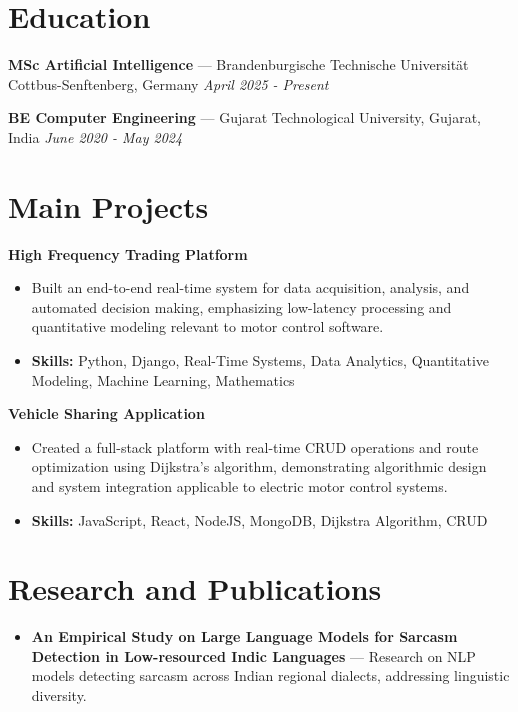 \documentclass[a4paper,10pt]{article}
\begin{document}
\section*{Education}
\textbf{MSc Artificial Intelligence} — Brandenburgische Technische Universität Cottbus-Senftenberg, Germany \hfill \textit{April 2025 - Present}\par
\vspace{1.5pt}
\textbf{BE Computer Engineering} — Gujarat Technological University, Gujarat, India \hfill \textit{June 2020 - May 2024}\par

\section*{Main Projects}
\textbf{High Frequency Trading Platform}\par
\vspace{1pt}
\begin{itemize}
  \item Built an end-to-end real-time system for data acquisition, analysis, and automated decision making, emphasizing low-latency processing and quantitative modeling relevant to motor control software.
  \item \textbf{Skills:} Python, Django, Real-Time Systems, Data Analytics, Quantitative Modeling, Machine Learning, Mathematics
\end{itemize}
\vspace{3pt}
\textbf{Vehicle Sharing Application}\par
\vspace{1pt}
\begin{itemize}
  \item Created a full-stack platform with real-time CRUD operations and route optimization using Dijkstra's algorithm, demonstrating algorithmic design and system integration applicable to electric motor control systems.
  \item \textbf{Skills:} JavaScript, React, NodeJS, MongoDB, Dijkstra Algorithm, CRUD
\end{itemize}

\section*{Research and Publications}
\begin{itemize}
\item \textbf{An Empirical Study on Large Language Models for Sarcasm Detection in Low-resourced Indic Languages} — Research on NLP models detecting sarcasm across Indian regional dialects, addressing linguistic diversity.
\end{itemize}
\end{document}
